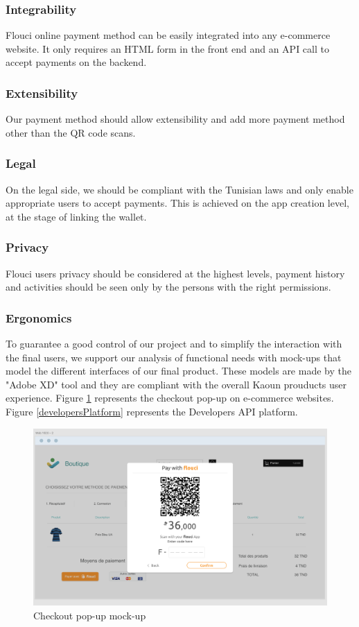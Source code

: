 \begin{spacing}{1.2}
\subsubsection{Integrability}
Flouci online payment method can be easily integrated into any e-commerce website. It only requires an HTML form in the front end and an API call to accept payments on the backend.

\subsubsection{Extensibility}
Our payment method should allow extensibility and add more payment method other than the QR code scans. 
\subsubsection{Legal}
On the legal side, we should be compliant with the Tunisian laws and only enable appropriate users to accept payments.
This is achieved on the app creation level, at the stage of linking the wallet.
\subsubsection{Privacy}
Flouci users privacy should be considered at the highest levels, payment history and activities should be seen only by the persons with the right permissions.
\subsubsection{Ergonomics}
To guarantee a good control of our project and to simplify the interaction with the final users, we support our analysis of functional needs with mock-ups that model the different interfaces of our final product. These models are made by the "Adobe XD" tool and they are compliant with the overall Kaoun prouducts user experience. \newline Figure \ref{checkoutScreen} represents the checkout pop-up on e-commerce websites.
\newline Figure \ref{developersPlatform} represents the Developers API platform.

\begin{figure}[H]\centering
\includegraphics[scale=0.3]{Checkout_screen}
\caption{Checkout pop-up mock-up}
\label{checkoutScreen}
\end{figure}


\end{spacing}
